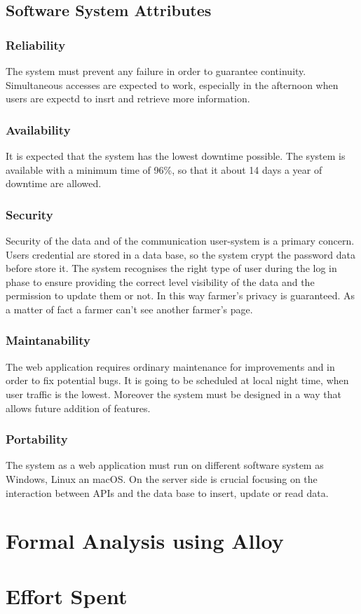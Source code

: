 \documentclass{article}
\begin{document}
\subsection{Software System Attributes}

\subsubsection{Reliability}
The system must prevent any failure in order to guarantee continuity. 
Simultaneous accesses are expected to work, especially in the afternoon when users are expectd to insrt and retrieve more information.

\subsubsection{Availability}
It is expected that the system has the lowest downtime possible. 
The system is available with a minimum time of 96\%, 
so that it about 14 days a year of downtime are allowed.


\subsubsection{Security}
\label{subsubsection:3.4.3}
Security of the data and of the communication user-system is a primary concern. Users credential are stored in a data base, so the system crypt the password data before store it. The system recognises the right type of user during the log in phase to ensure providing the correct level visibility of the data and the permission to update them or not. In this way farmer’s privacy is guaranteed. As a matter of fact a farmer can’t see another farmer’s page.


\subsubsection{Maintanability}
The web application requires ordinary maintenance for improvements and in order to fix potential bugs. 
It is going to be scheduled at local night time, when user traffic is the lowest.
Moreover the system must be designed in a way that allows future addition of features.

\subsubsection{Portability}
The system as a web application must run on different software system as Windows, Linux an macOS.
On the server side is crucial focusing on the interaction between APIs and the data base to insert, update or read data.



\section{Formal Analysis using Alloy}

\section{Effort Spent}
\end{document}
